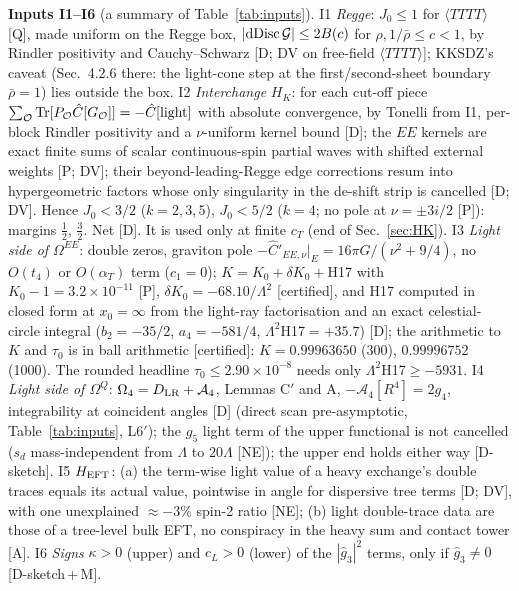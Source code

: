 \documentclass[aps,prl,onecolumn,superscriptaddress,nofootinbib]{revtex4-2}
\begin{document}
\textbf{Inputs I1--I6} (a summary of Table~\ref{tab:inputs}).
I1 \emph{Regge}: $J_0\le1$ for $\langle TTTT\rangle$~\cite[Sec.~4.2.4]{KKSDZ} [Q], made uniform on the Regge box,
$|{\rm dDisc}\,\mathcal G|\le2B(c)$ for $\rho,1/\bar\rho\le c<1$, by Rindler positivity and Cauchy--Schwarz [D; DV on
free-field $\langle TTTT\rangle$]; KKSDZ's caveat (Sec.~4.2.6 there: the light-cone step at the first/second-sheet
boundary $\bar\rho=1$) lies outside the box.
I2 \emph{Interchange} $H_K$: for each cut-off piece $\sum_{\mathcal O}{\rm Tr}[P_{\mathcal O}\hat C[G_{\mathcal O}]]=-\hat C[\text{light}]$
with absolute convergence, by Tonelli from I1, per-block Rindler positivity and a $\nu$-uniform kernel bound [D];
the $EE$ kernels are exact finite sums of scalar continuous-spin partial waves with shifted external weights
[P; DV]; their beyond-leading-Regge edge corrections resum into hypergeometric factors whose only singularity in
the de-shift strip is cancelled [D; DV]. Hence $J_0<3/2$ ($k=2,3,5$), $J_0<5/2$ ($k=4$; no pole at $\nu=\pm3i/2$ [P]):
margins $\tfrac12$, $\tfrac32$. Net [D]. It is used only at finite $c_T$ (end of Sec.~\ref{sec:HK}).
I3 \emph{Light side of $\Omega^{EE}$}: double zeros, graviton pole $-\hat C'_{EE,\nu}|_E=16\pi G/(\nu^2+9/4)$, no $O(t_4)$ or $O(\alpha_T)$ term ($c_1=0$);
$K=K_0+\delta K_0+$H17 with $K_0-1=3.2\times10^{-11}$ [P], $\delta K_0=-68.10/\Lambda^2$ [certified], and H17 computed in closed form at $x_0=\infty$
from the light-ray factorisation and an exact celestial-circle integral ($b_2=-35/2$, $a_4=-581/4$, $\Lambda^2$H17$=+35.7$) [D]; the arithmetic to $K$ and
$\tau_0$ is in ball arithmetic [certified]: $K=0.99963650$ (300), $0.99996752$ (1000). The rounded headline $\tau_0\le2.90\times10^{-8}$ needs only
$\Lambda^2$H17$\ge-5931$.
I4 \emph{Light side of $\Omega^Q$}: $\Omega_4=D_{\rm LR}+\mathcal A_4$, Lemmas C$'$ and A, $-\mathcal A_4[R^4]=2g_4$,
integrability at coincident angles [D] (direct scan pre-asymptotic, Table~\ref{tab:inputs}, L6$'$); the $g_5$ light term
of the upper functional is not cancelled ($s_d$ mass-independent from $\Lambda$ to $20\Lambda$ [NE]); the upper end
holds either way [D-sketch].
I5 $H_{\rm EFT}$: (a) the term-wise light value of a heavy exchange's double traces equals its actual value,
pointwise in angle for dispersive tree terms [D; DV], with one unexplained $\approx-3\%$ spin-2 ratio [NE]; (b) light
double-trace data are those of a tree-level bulk EFT, no conspiracy in the heavy sum and contact tower [A].
I6 \emph{Signs} $\kappa>0$ (upper) and $c_L>0$ (lower) of the $|\hat g_3|^2$ terms, only if $\hat g_3\ne0$
[D-sketch\,+\,M].
\end{document}
